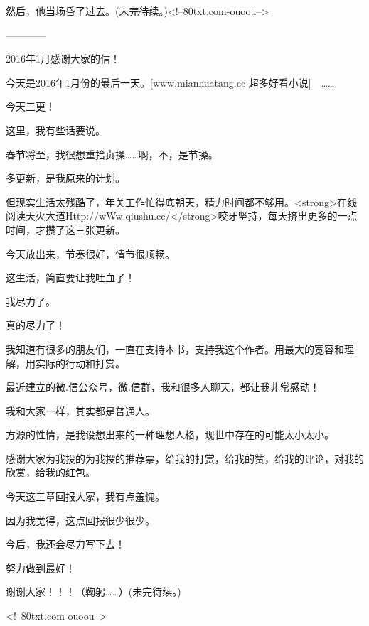 \begin{this_body}
然后，他当场昏了过去。(未完待续。)<!--80txt.com-ouoou-->

------------

2016年1月感谢大家的信！

今天是2016年1月份的最后一天。[www.mianhuatang.cc 超多好看小说]　……

今天三更！

这里，我有些话要说。

春节将至，我很想重拾贞操……啊，不，是节操。

多更新，是我原来的计划。

但现实生活太残酷了，年关工作忙得底朝天，精力时间都不够用。<strong>在线阅读天火大道Http://wWw.qiushu.cc/</strong>咬牙坚持，每天挤出更多的一点时间，才攒了这三张更新。

今天放出来，节奏很好，情节很顺畅。

这生活，简直要让我吐血了！

我尽力了。

真的尽力了！

我知道有很多的朋友们，一直在支持本书，支持我这个作者。用最大的宽容和理解，用实际的行动和打赏。

最近建立的微.信公众号，微.信群，我和很多人聊天，都让我非常感动！

我和大家一样，其实都是普通人。

方源的性情，是我设想出来的一种理想人格，现世中存在的可能太小太小。

感谢大家为我投的为我投的推荐票，给我的打赏，给我的赞，给我的评论，对我的欣赏，给我的红包。

今天这三章回报大家，我有点羞愧。

因为我觉得，这点回报很少很少。

今后，我还会尽力写下去！

努力做到最好！

谢谢大家！！！（鞠躬……）(未完待续。)

<!--80txt.com-ouoou-->

\end{this_body}

